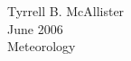 % 
% 
% 
% 
%






   \frontmatter
   
   {\singlespacing
   \begin{flushright}
      Tyrrell B. McAllister \\
      June 2006 \\
      Meteorology \\
   \end{flushright}
   }

   \bigskip

   
   
   \doublespacing
	
	 \pagestyle{abstract2}
   
	 \thispagestyle{abstract1}
   
